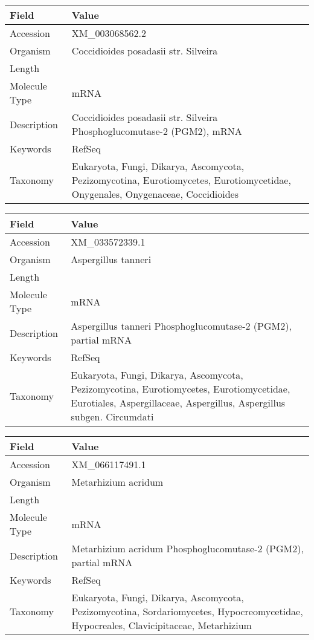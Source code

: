 \documentclass[10pt]{article}
\begin{document}
\vspace{1em}
{\footnotesize
\begin{longtable}{>{\raggedright\arraybackslash}p{4.5cm} >{\raggedright\arraybackslash}p{11.5cm}}
\textbf{Field} & \textbf{Value} \\
\hline
Accession & XM\_003068562.2 \\
Organism & Coccidioides posadasii str. Silveira \\
Length & 3828 \\
Molecule Type & mRNA \\
Description & Coccidioides posadasii str. Silveira Phosphoglucomutase-2 (PGM2), mRNA \\
Keywords & RefSeq \\
Taxonomy & Eukaryota, Fungi, Dikarya, Ascomycota, Pezizomycotina, Eurotiomycetes, Eurotiomycetidae, Onygenales, Onygenaceae, Coccidioides \\
\end{longtable}
}

\vspace{1em}
{\footnotesize
\begin{longtable}{>{\raggedright\arraybackslash}p{4.5cm} >{\raggedright\arraybackslash}p{11.5cm}}
\textbf{Field} & \textbf{Value} \\
\hline
Accession & XM\_033572339.1 \\
Organism & Aspergillus tanneri \\
Length & 1668 \\
Molecule Type & mRNA \\
Description & Aspergillus tanneri Phosphoglucomutase-2 (PGM2), partial mRNA \\
Keywords & RefSeq \\
Taxonomy & Eukaryota, Fungi, Dikarya, Ascomycota, Pezizomycotina, Eurotiomycetes, Eurotiomycetidae, Eurotiales, Aspergillaceae, Aspergillus, Aspergillus subgen. Circumdati \\
\end{longtable}
}

\vspace{1em}
{\footnotesize
\begin{longtable}{>{\raggedright\arraybackslash}p{4.5cm} >{\raggedright\arraybackslash}p{11.5cm}}
\textbf{Field} & \textbf{Value} \\
\hline
Accession & XM\_066117491.1 \\
Organism & Metarhizium acridum \\
Length & 1662 \\
Molecule Type & mRNA \\
Description & Metarhizium acridum Phosphoglucomutase-2 (PGM2), partial mRNA \\
Keywords & RefSeq \\
Taxonomy & Eukaryota, Fungi, Dikarya, Ascomycota, Pezizomycotina, Sordariomycetes, Hypocreomycetidae, Hypocreales, Clavicipitaceae, Metarhizium \\
\end{longtable}
}
\end{document}
